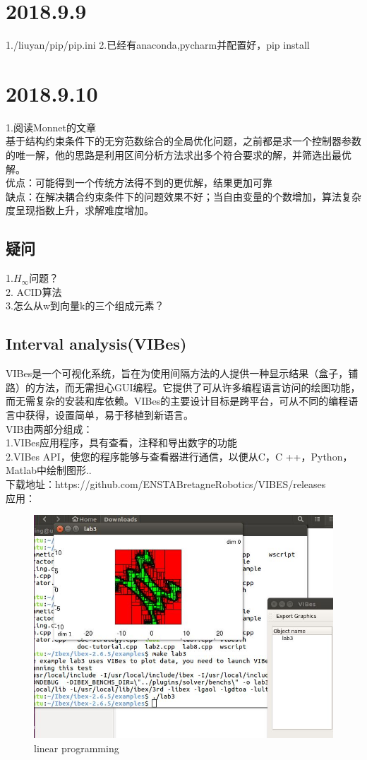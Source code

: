 \documentclass[UTF8]{ctexart}
\begin{document}
\section{2018.9.9}
1./liuyan/pip/pip.ini
2.已经有anaconda,pycharm并配置好，pip install
\section{2018.9.10}
1.阅读Monnet的文章\\
基于结构约束条件下的无穷范数综合的全局优化问题，之前都是求一个控制器参数的唯一解，他的思路是利用区间分析方法求出多个符合要求的解，并筛选出最优解。\\
优点：可能得到一个传统方法得不到的更优解，结果更加可靠\\
缺点：在解决耦合约束条件下的问题效果不好；当自由变量的个数增加，算法复杂度呈现指数上升，求解难度增加。\\

\subsection{疑问}
1.$H_{\infty}$问题？\\
2. ACID算法\\
3.怎么从w到向量k的三个组成元素？\\
\subsection{Interval analysis(VIBes)}
VIBes是一个可视化系统，旨在为使用间隔方法的人提供一种显示结果（盒子，铺路）的方法，而无需担心GUI编程。它提供了可从许多编程语言访问的绘图功能，而无需复杂的安装和库依赖。VIBes的主要设计目标是跨平台，可从不同的编程语言中获得，设置简单，易于移植到新语言。\\

VIB由两部分组成：\\
1.VIBes应用程序，具有查看，注释和导出数字的功能\\
2.VIBes API，使您的程序能够与查看器进行通信，以便从C，C ++，Python，Matlab中绘制图形..\\

下载地址：https://github.com/ENSTABretagneRobotics/VIBES/releases\\

应用：\\
\begin{figure}
  \includegraphics[width=.8\linewidth]{lab3.JPG}
  \caption{linear programming}
  \label{fig:boat1}
\end{figure}
\end{document}
